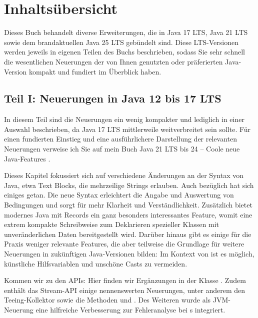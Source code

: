 \section{Inhaltsübersicht}


Dieses Buch behandelt diverse Erweiterungen,
die in Java 17 LTS, Java 21 LTS sowie dem brandaktuellen Java 25 LTS gebündelt sind.
Diese LTS-Versionen werden jeweils in eigenen Teilen des Buchs beschrieben, sodass Sie
sehr schnell die wesentlichen Neuerungen der von Ihnen genutzten oder präferierten
Java-Version kompakt und fundiert im Überblick haben.




\subsection{Teil I: Neuerungen in Java 12 bis 17 LTS}


In diesem Teil sind die Neuerungen ein wenig kompakter und lediglich in einer
Auswahl beschrieben, da Java 17 LTS mittlerweile weitverbreitet sein sollte.
Für einen fundierten Einstieg und eine ausführlichere Darstellung der
relevanten Neuerungen verweise ich Sie auf mein
Buch \frqq Java 21 LTS bis 24 -- Coole neue Java-Features\flqq{} \cite{Java-21-LTS-24:2025}.


Dieses Kapitel fokussiert sich auf verschiedene Änderungen an der Syntax von Java, etwa
 \frqq Text Blocks\flqq{}, die mehrzeilige Strings erlauben.
Auch bezüglich  hat sich einiges getan.
Die neue Syntax erleichtert die Angabe und Auswertung von Bedingungen und
sorgt für mehr Klarheit und Verständlichkeit.
Zusätzlich bietet modernes Java mit Records ein ganz besonders
 interessantes Feature, womit eine extrem kompakte Schreibweise zum Deklarieren
spezieller Klassen mit unveränderlichen Daten bereitgestellt wird.
Darüber hinaus gibt es einige für die Praxis weniger relevante Features, die aber teilweise
die Grundlage für weitere Neuerungen in zukünftigen Java-Versionen bilden:
 Im Kontext von  ist es möglich,
künstliche Hilfsvariablen und unschöne Casts zu vermeiden.


Kommen wir zu den APIs: Hier finden wir  Ergänzungen in der Klasse .
Zudem enthält das Stream-API einige nennenswerten Neuerungen, unter anderem den  Teeing-Kollektor
 sowie die Methoden  und  .
Des Weiteren wurde als JVM-Neuerung eine hilfreiche
Verbesserung zur Fehleranalyse bei s integriert.






